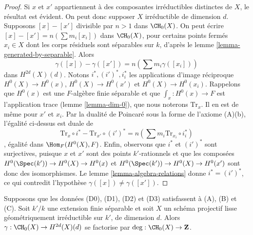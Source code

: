 \begin{proof}
Si $x$ et $x'$ appartiennent à des composantes irréductibles distinctes de $X$,
le résultat est évident. On peut donc supposer $X$ irréductible de dimension $d$.
Supposons $[x] - [x']$ divisible par $n > 1$ dans $\CH_0(X)$.
On peut écrire $[x] - [x'] = n(\sum m_i [x_i])$ dans $\CH_0(X)$,
pour certains points fermés $x_i \in X$
dont les corps résiduels sont séparables sur $k$, d'après
le lemme \ref{lemma-generated-by-separable}.
Alors
$$
\gamma([x]) - \gamma([x']) = n (\sum m_i \gamma([x_i]))
$$
dans $H^{2d}(X)(d)$. Notons $i^*, (i')^*, i_i^*$ les applications d'image réciproque
$H^0(X) \to H^0(x)$, $H^0(X) \to H^0(x')$ et $H^0(X) \to H^0(x_i)$.
Rappelons que $H^0(x)$ est une $F$-algèbre finie séparable
et que $\int_x : H^0(x) \to F$ est l'application trace
(lemme \ref{lemma-dim-0}), que nous noterons $\text{Tr}_x$.
Il en est de même pour $x'$ et $x_i$. Par la dualité de Poincar\'e sous la forme
de l'axiome (A)(b), l'égalité ci-dessus est duale de
$$
\text{Tr}_x \circ i^* - \text{Tr}_{x'} \circ (i')^* =
n(\sum m_i \text{Tr}_{x_i} \circ i_i^*)
$$,
égalité dans $\Hom_F(H^0(X), F)$. Enfin, observons que
$i^*$ et $(i')^*$ sont surjectives, puisque $x$ et $x'$ sont des points $k'$-rationnels
et que les composées $H^0(\Spec(k')) \to H^0(X) \to H^0(x)$
et $H^0(\Spec(k')) \to H^0(X) \to H^0(x')$ sont donc des isomorphismes.
Le lemme \ref{lemma-algebra-relations} donne $i^* = (i')^*$,
ce qui contredit l'hypothèse $\gamma([x]) \not = \gamma([x'])$.
\end{proof}

\begin{lemma}
\label{lemma-classes-points}
Supposons que les données (D0), (D1), (D2) et (D3) satisfassent à (A), (B) et (C).
Soit $k'/k$ une extension finie séparable et soit $X$ un schéma projectif lisse
géométriquement irréductible sur $k'$, de dimension $d$.
Alors $\gamma : \CH_0(X) \to H^{2d}(X)(d)$ se factorise par
$\deg : \CH_0(X) \to \mathbf{Z}$.
\end{lemma}

